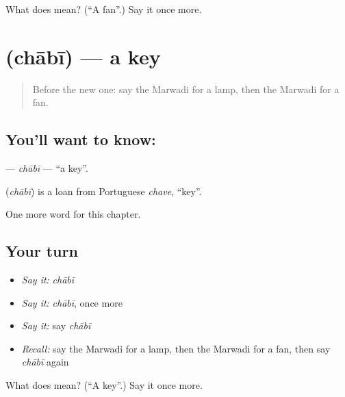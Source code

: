 \begin{tcolorbox}[breakable,colback=teal!4,colframe=teal!35!black,title={Before you move on}]
What does  mean? (\textquotedblleft{}A fan\textquotedblright{}.) Say it once more.
\end{tcolorbox}
\section[\texorpdfstring{\mw{चाबी} (chābī)}{चाबी (chābī)}]{ (chābī) — a key}

\label{lesson:MW-C63-chabi}



\begin{quote}
Before the new one: say the Marwadi for a lamp, then the Marwadi for a fan.
\end{quote}

\subsection*{You'll want to know: }
\textbf{} — \emph{chābī} — \textquotedblleft{}a key\textquotedblright{}.

\begin{cousinweb}
\textbf{} (\emph{chābī}) is a loan from Portuguese \emph{chave}, \textquotedblleft{}key\textquotedblright{}.
\end{cousinweb}

\begin{grammarlens}[title={What you've built}]
One more word for this chapter.
\end{grammarlens}

\subsection*{Your turn}
\begin{itemize}
\raggedright
  \item \emph{Say it:} \emph{chābī}
  \item \emph{Say it:} \emph{chābī}, once more
  \item \emph{Say it:} say \emph{chābī}
  \item \emph{Recall:} say the Marwadi for a lamp, then the Marwadi for a fan, then say \emph{chābī} again
\end{itemize}

\begin{tcolorbox}[breakable,colback=teal!4,colframe=teal!35!black,title={Before you move on}]
What does  mean? (\textquotedblleft{}A key\textquotedblright{}.) Say it once more.
\end{tcolorbox}
